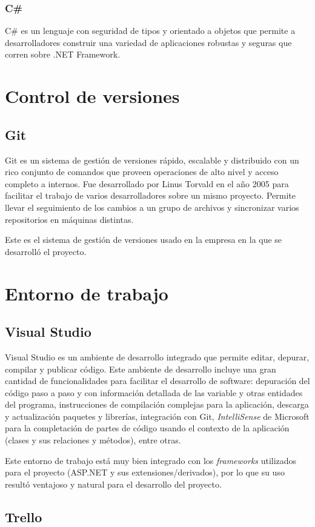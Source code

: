 \subsubsection{C\#}
C\# es un lenguaje con seguridad de tipos y orientado a objetos que permite a desarrolladores construir una variedad de aplicaciones robustas y seguras que corren sobre .NET Framework. \cite{cSharpMicrosoft}

\section{Control de versiones}
\subsection{Git}
Git es un sistema de gestión de versiones rápido, escalable y distribuido con un rico conjunto de comandos que proveen operaciones de alto nivel y acceso completo a internos. \cite{gitGit} Fue desarrollado por Linus Torvald en el año 2005 para facilitar el trabajo de varios desarrolladores sobre un mismo proyecto. Permite llevar el seguimiento de los cambios a un grupo de archivos y sincronizar varios repositorios en máquinas distintas.

Este es el sistema de gestión de versiones usado en la empresa en la que se desarrolló el proyecto.

\section{Entorno de trabajo}
\subsection{Visual Studio}
Visual Studio es un ambiente de desarrollo integrado que permite editar, depurar, compilar y publicar código. \cite{visualStudioMicrosoft} Este ambiente de desarrollo incluye una gran cantidad de funcionalidades para facilitar el desarrollo de software: depuración del código paso a paso y con información detallada de las variable y otras entidades del programa, instrucciones de compilación complejas para la aplicación, descarga y actualización paquetes y librerías, integración con Git, \textit{IntelliSense} de Microsoft para la completación de partes de código usando el contexto de la aplicación (clases y sus relaciones y métodos), entre otras.

Este entorno de trabajo está muy bien integrado con los \textit{frameworks} utilizados para el proyecto (ASP.NET y sus extensiones/derivados), por lo que su uso resultó ventajoso y natural para el desarrollo del proyecto.

\subsection{Trello}

